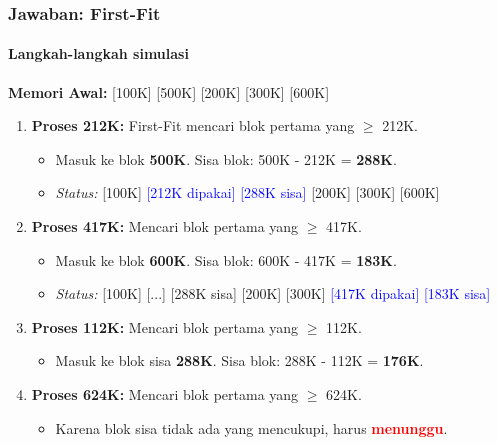 \documentclass[t,aspectratio=169,xcolor=dvipsnames]{beamer}
\newcommand{\tem}[1]{\textbf{\textcolor{red}{#1}}}
\begin{document}
\begin{frame}
    \frametitle{Jawaban: First-Fit}
    \framesubtitle{Langkah-langkah simulasi}
    \small
    \textbf{Memori Awal:} [100K] [500K] [200K] [300K] [600K]
    
    \begin{enumerate}
        \item \textbf{Proses 212K:} First-Fit mencari blok pertama yang $\ge$ 212K.
        \begin{itemize}
            \item Masuk ke blok \textbf{500K}. Sisa blok: 500K - 212K = \textbf{288K}.
            \item \textit{Status:} [100K] \textcolor{blue}{[212K dipakai] [288K sisa]} [200K] [300K] [600K]
        \end{itemize}
        \item \textbf{Proses 417K:} Mencari blok pertama yang $\ge$ 417K.
        \begin{itemize}
            \item Masuk ke blok \textbf{600K}. Sisa blok: 600K - 417K = \textbf{183K}.
            \item \textit{Status:} [100K] [...] [288K sisa] [200K] [300K] \textcolor{blue}{[417K dipakai] [183K sisa]}
        \end{itemize}
        \item \textbf{Proses 112K:} Mencari blok pertama yang $\ge$ 112K.
        \begin{itemize}
            \item Masuk ke blok sisa \textbf{288K}. Sisa blok: 288K - 112K = \textbf{176K}.
        \end{itemize}
        \item \textbf{Proses 624K:} Mencari blok pertama yang $\ge$ 624K.
        \begin{itemize}
            \item Karena blok sisa tidak ada yang mencukupi, harus \tem{menunggu}.
        \end{itemize}
    \end{enumerate}
\end{frame}
\end{document}
